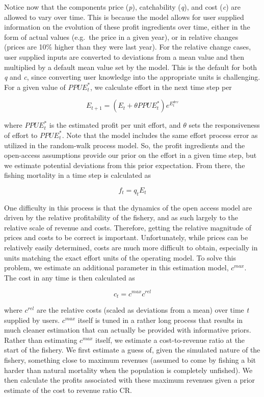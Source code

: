 \documentclass[twoside,12pt,final]{ucthesis-CA2012}
\begin{document}
\begin{ucmainmatter}
Notice now that the components price (\emph{p}), catchability
(\emph{q}), and cost (\emph{c}) are allowed to vary over time. This is
because the model allows for user supplied information on the evolution
of these profit ingredients over time, either in the form of actual
values (e.g.~the price in a given year), or in relative changes (prices
are 10\% higher than they were last year). For the relative change
cases, user supplied inputs are converted to deviations from a mean
value and then multiplied by a default mean value set by the model. This
is the default for both \emph{q} and \emph{c}, since converting user
knowledge into the appropriate units is challenging. For a given value
of \(PPUE_{t}^*\), we calculate effort in the next time step per

\[E_{t + 1} = (E_{t} + \theta{PPUE_{t}^*})e^{E^{dev}_{t}}\]

where \(PPUE_{t}^*\) is the estimated profit per unit effort, and
\(\theta\) sets the responsiveness of effort to \(PPUE_{t}^*\). Note
that the model includes the same effort process error as utilized in the
random-walk process model. So, the profit ingredients and the
open-access assumptions provide our prior on the effort in a given time
step, but we estimate potential deviations from this prior expectation.
From there, the fishing mortality in a time step is calculated as

\[f_{t} = q_{t}E_{t}\]

One difficulty in this process is that the dynamics of the open access
model are driven by the relative profitability of the fishery, and as
such largely to the relative scale of revenue and costs. Therefore,
getting the relative magnitude of prices and costs to be correct is
important. Unfortunately, while prices can be relatively easily
determined, costs are much more difficult to obtain, especially in units
matching the exact effort units of the operating model. To solve this
problem, we estimate an additional parameter in this estimation model,
\(c^{max}\). The cost in any time is then calculated as

\[c_t  = c^{max}c^{rel}\]

where \(c^{rel}\) are the relative costs (scaled as deviations from a
mean) over time \emph{t} supplied by users. \(c^{max}\) itself is tuned
in a rather long process that results in much cleaner estimation that
can actually be provided with informative priors. Rather than estimating
\(c^{max}\) itself, we estimate a cost-to-revenue ratio at the start of
the fishery. We first estimate a guess of, given the simulated nature of
the fishery, something close to maximum revenues (assumed to come by
fishing a bit harder than natural mortality when the population is
completely unfished). We then calculate the profits associated with
these maximum revenues given a prior estimate of the cost to revenue
ratio CR.


\end{ucmainmatter}
\end{document}
